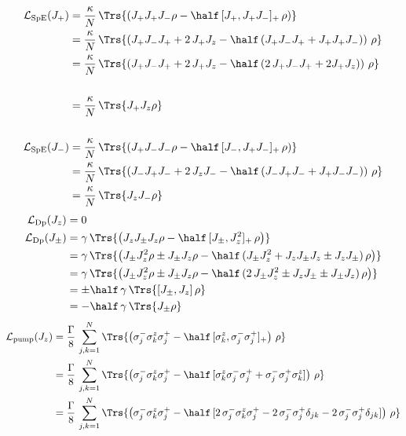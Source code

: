 \begin{appendices}
    \begin{align*}
        \mathcal{L}_\text{SpE}(J_+)&=\frac{\kappa}{N}\,\Trs{\left(J_+ J_+ J_- \rho-\half\,[J_+,J_+ J_-]_+\,\rho\right)}\\
        &=\frac{\kappa}{N}\,\Trs{\left(J_+ J_- J_+ + 2\,J_+ J_z -\half\,(J_+ J_- J_+ + J_+ J_+ J_-)\right)\,\rho}\\ &=\frac{\kappa}{N}\,\Trs{\left(J_+ J_- J_+ + 2\,J_+ J_z -\half\,(2\,J_+ J_- J_+ + 2 J_+ J_z)\right)\,\rho}\\\\
        &=\frac{\kappa}{N}\,\Trs{J_+ J_z \rho}\\\\
        \mathcal{L}_\text{SpE}(J_-)&=\frac{\kappa}{N}\,\Trs{\left(J_+ J_- J_- \rho-\half\,[J_-,J_+ J_-]_+\,\rho\right)}\\
        &=\frac{\kappa}{N}\,\Trs{\left(J_- J_+ J_- + 2\,J_z J_- -\half\,(J_- J_+ J_- + J_+ J_- J_-)\right)\,\rho}\\ 
        &=\frac{\kappa}{N}\,\Trs{J_z J_- \rho}
    \end{align*}
    \begin{align*}
        \mathcal{L}_\text{Dp}(J_z)&=0\\
        \mathcal{L}_\text{Dp}(J_\pm)&=\gamma\,\Trs{\left(J_z J_\pm J_z \rho-\half\,[J_\pm,J_z^2]_+\,\rho\right)}\\
        &=\gamma\,\Trs{\left(J_\pm J_z^2\rho \pm J_\pm J_z \rho-\half\,(J_\pm J_z^2 + J_z J_\pm J_z \pm J_z J_\pm)\,\rho\right)}\\
        &=\gamma\,\Trs{\left(J_\pm J_z^2\rho \pm J_\pm J_z \rho-\half\,(2\,J_\pm J_z^2  \pm J_z J_\pm \pm J_\pm J_z)\,\rho\right)}\\
        &=\pm\half\, \gamma\,\Trs{[J_\pm,J_z]\,\rho}\\
        &=-\half\,\gamma\,\Trs{J_\pm\rho}
    \end{align*}
    \begin{align*}
        \mathcal{L}_\text{pump}(J_z)&=\frac{\Gamma}{8}\,\sum_{j,k=1}^N \Trs{\left( \sigma_j^- \sigma_k^z \sigma_j^+ -\half\,[\sigma_k^z,\sigma_j^-\sigma_j^+]_+   \right)\,\rho}\\
        &=\frac{\Gamma}{8}\,\sum_{j,k=1}^N \Trs{\left( \sigma_j^- \sigma_k^z \sigma_j^+ -\half\,[\sigma_k^z\sigma_j^-\sigma_j^++\sigma_j^-\sigma_j^+\sigma_k^z]   \right)\,\rho}\\
        &=\frac{\Gamma}{8}\,\sum_{j,k=1}^N \Trs{\left( \sigma_j^- \sigma_k^z \sigma_j^+ -\half\,[2\,\sigma_j^-\sigma_k^z\sigma_j^+  -2\, \sigma_j^-\sigma_j^+\delta_{jk}-2\, \sigma_j^-\sigma_j^+\delta_{jk}]   \right)\,\rho}\\

\end{align*}
\end{appendices}
